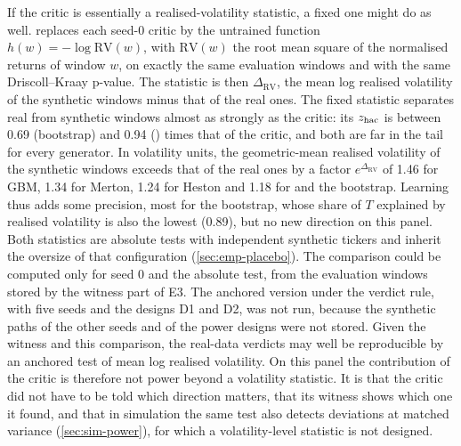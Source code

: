 If the critic is essentially a realised-volatility statistic, a fixed one might do as well.
 replaces each seed-0 critic by the untrained function
$h(w)=-\log\mathrm{RV}(w)$, with $\mathrm{RV}(w)$ the root mean square of the normalised returns
of window $w$, on exactly the same evaluation windows and with the same Driscoll--Kraay p-value.
The statistic is then $\Delta_{\mathrm{RV}}$, the mean log realised volatility of the synthetic
windows minus that of the real ones. The fixed statistic separates real from synthetic windows
almost as strongly as the critic: its $z_{\mathrm{hac}}$ is between 0.69 (bootstrap) and 0.94 (\GARCHt{})
times that of the critic, and both are far in the tail for every generator. In volatility units,
the geometric-mean realised volatility of the synthetic windows exceeds that of the real ones by
a factor $e^{\Delta_{\mathrm{RV}}}$ of 1.46 for GBM, 1.34 for Merton, 1.24 for Heston and 1.18
for \GARCHt{} and the bootstrap. Learning thus adds some precision, most for the bootstrap, whose
share of $T$ explained by realised volatility is also the lowest (0.89), but no new direction on
this panel. Both statistics are absolute tests with independent synthetic tickers and inherit
the oversize of that configuration (\cref{sec:emp-placebo}). The comparison could be computed
only for seed 0 and the absolute test, from the evaluation windows stored by the witness part of
E3. The anchored version under the verdict rule, with five seeds and the designs D1 and D2, was
not run, because the synthetic paths of the other seeds and of the power designs were not
stored. Given the witness and this comparison, the real-data verdicts may well be reproducible
by an anchored test of mean log realised volatility. On this panel the contribution of the critic
is therefore not power beyond a volatility statistic. It is that the critic did not have to be
told which direction matters, that its witness shows which one it found, and that in simulation
the same test also detects deviations at matched variance (\cref{sec:sim-power}), for which a
volatility-level statistic is not designed.

